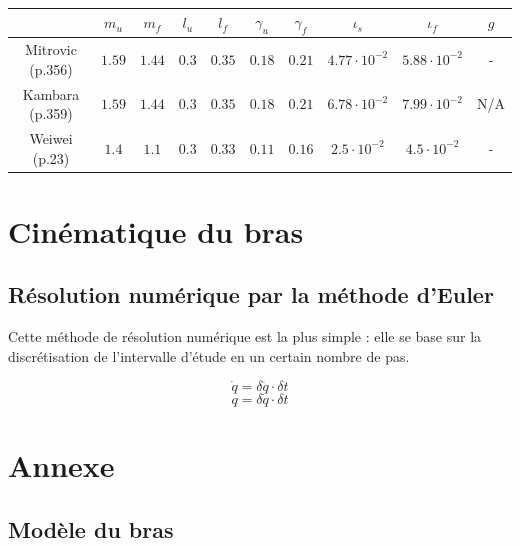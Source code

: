 \documentclass[pdftex,a4paper,11pt]{article}
\numberwithin{equation}{subsection}
\begin{document}
\paragraph{}
\begin{small}
\begin{tabular}{|c|c|c|c|c|c|c|c|c|c|}
    \hline
             & $m_u$  & $m_f$  & $l_u$ & $l_f$  & $\gamma_u$ & $\gamma_f$ & $\iota_s$            & $\iota_f$            & $\hat{g}$ \\
    \hline
    Mitrovic \cite{katayama1993} (p.356) 
             & $1.59$ & $1.44$ & $0.3$ & $0.35$ & $0.18$     & $0.21$     & $4.77 \cdot 10^{-2}$ & $5.88 \cdot 10^{-2}$ & - \\
    \hline
    Kambara  \cite{kambara2009} (p.359)
             & $1.59$ & $1.44$ & $0.3$ & $0.35$ & $0.18$     & $0.21$     & $6.78 \cdot 10^{-2}$ & $7.99 \cdot 10^{-2}$ & N/A \\
    \hline
    Weiwei   \cite{li2006} (p.23)
             & $1.4$  & $1.1$  & $0.3$ & $0.33$ & $0.11$     & $0.16$     & $2.5 \cdot 10^{-2}$  & $4.5 \cdot 10^{-2}$  & - \\
    \hline
\end{tabular}
\end{small}


\section{Cinématique du bras}

\subsection{Résolution numérique par la méthode d'Euler}

Cette méthode de résolution numérique est la plus simple : elle se base sur la discrétisation de l'intervalle d'étude en un certain nombre de pas.

\[\dot{q} = \delta \ddot{q} \cdot \delta t\]
\[q = \delta \dot{q} \cdot \delta t\]


\section{Annexe}

\subsection{Modèle du bras}
\end{document}
